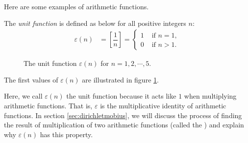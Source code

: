 \documentclass[12pt]{subfile}
\begin{document}
	Here are some examples of arithmetic functions.
		\begin{definition}
			The \textit{unit function} is defined as below for all positive integers $n$:
				\begin{align*}
					\varepsilon(n) & =\left[\dfrac 1n\right] =\begin{cases}1&\mbox{ if }n=1,\\0&\mbox{ if }n>1.\end{cases}
				\end{align*}

			\begin{figure}
			\centering
			\caption{The unit function $\varepsilon(n)$ for $n=1,2,\cdots,5$.}
			\label{fig:unitfunction}
		\end{figure}
			The first values of $\varepsilon(n)$ are illustrated in figure \ref{fig:unitfunction}.
		\end{definition}

		\begin{note}
			Here, we call $\varepsilon(n)$ the unit function because it acts like $1$ when multiplying arithmetic functions. That is, $\varepsilon$ is the multiplicative identity of arithmetic functions. In section \ref{sec:dirichletmobius}, we will discuss the process of finding the result of multiplication of two arithmetic functions (called the ) and explain why $\varepsilon(n)$ has this property.
		\end{note}
\end{document}
